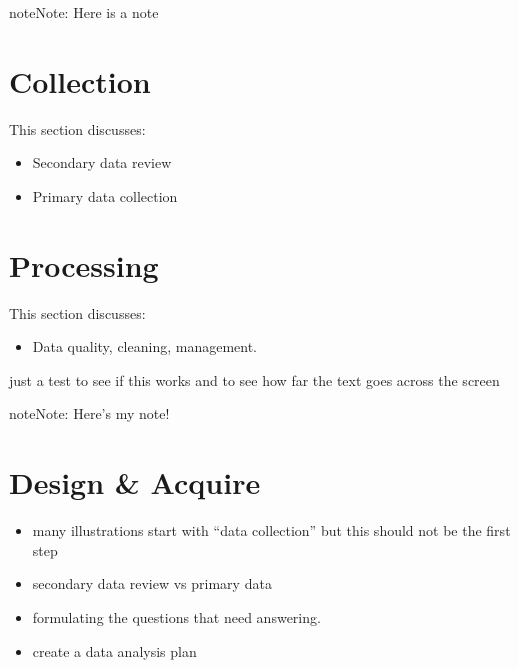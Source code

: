\documentclass[letterpaper,10pt,english]{jupyterBook}
\begin{document}
\begin{sphinxadmonition}{note}{Note:}
\sphinxAtStartPar
Here is a note
\end{sphinxadmonition}


\chapter{Collection}
\label{\detokenize{part1/what is information management:collection}}
\sphinxAtStartPar
This section discusses:
\begin{itemize}
\item {} 
\sphinxAtStartPar
Secondary data review

\item {} 
\sphinxAtStartPar
Primary data collection

\end{itemize}


\chapter{Processing}
\label{\detokenize{part1/what is information management:processing}}
\sphinxAtStartPar
This section discusses:
\begin{itemize}
\item {} 
\sphinxAtStartPar
Data quality, cleaning, management.

\end{itemize}

\begin{sphinxShadowBox}

\sphinxAtStartPar
just a test to see if this works and to see how far the text goes across the screen
\end{sphinxShadowBox}

\begin{sphinxShadowBox}
\sphinxstylesidebartitle{}

\begin{sphinxadmonition}{note}{Note:}
\sphinxAtStartPar
Here’s my note!
\end{sphinxadmonition}
\end{sphinxShadowBox}


\chapter{Design \& Acquire}
\label{\detokenize{part1/design:design-acquire}}\label{\detokenize{part1/design::doc}}\begin{itemize}
\item {} 
\sphinxAtStartPar
many illustrations start with “data collection” but this should not be the first step

\item {} 
\sphinxAtStartPar
secondary data review vs primary data

\item {} 
\sphinxAtStartPar
formulating the questions that need answering.

\item {} 
\sphinxAtStartPar
create a data analysis plan

\end{itemize}
\end{document}

